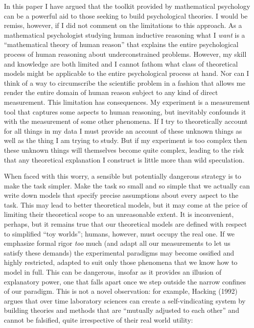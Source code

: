 \documentclass[
  english,
  doc]{apa6}
\begin{document}
\noindent
In this paper I have argued that the toolkit provided by mathematical psychology can be a powerful aid to those seeking to build psychological theories. I would be remiss, however, if I did not comment on the limitations to this approach. As a mathematical psychologist studying human inductive reasoning what I \emph{want} is a \enquote{mathematical theory of human reason} that explains the entire psychological process of human reasoning about underconstrained problems. However, my skill and knowledge are both limited and I cannot fathom what class of theoretical models might be applicable to the entire psychological process at hand. Nor can I think of a way to circumscribe the scientific problem in a fashion that allows me render the entire domain of human reason subject to any kind of direct measurement. This limitation has consequences. My experiment is a measurement tool that captures some aspects to human reasoning, but inevitably confounds it with the measurement of some other phenomena. If I try to theoretically account for all things in my data I must provide an account of these unknown things as well as the thing I am trying to study. But if my experiment is too complex then these unknown things will themselves become quite complex, leading to the risk that any theoretical explanation I construct is little more than wild speculation.

When faced with this worry, a sensible but potentially dangerous strategy is to make the task simpler. Make the task so small and so simple that we actually can write down models that specify precise assumptions about every aspect to the task. This may lead to better theoretical models, but it may come at the price of limiting their theoretical scope to an unreasonable extent. It is inconvenient, perhaps, but it remains true that our theoretical models are defined with respect to simplified \enquote{toy worlds}; humans, however, must occupy the real one. If we emphasize formal rigor \emph{too} much (and adapt all our measurements to let us satisfy these demands) the experimental paradigms may become ossified and highly restricted, adapted to suit only those phenomena that we know how to model in full. This can be dangerous, insofar as it provides an illusion of explanatory power, one that falls apart once we step outside the narrow confines of our paradigm. This is not a novel observation: for example, Hacking (1992) argues that over time laboratory sciences can create a self-vindicating system by building theories and methods that are \enquote{mutually adjusted to each other} and cannot be falsified, quite irrespective of their real world utility:
\end{document}
